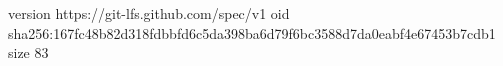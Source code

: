 version https://git-lfs.github.com/spec/v1
oid sha256:167fc48b82d318fdbbfd6c5da398ba6d79f6bc3588d7da0eabf4e67453b7cdb1
size 83
